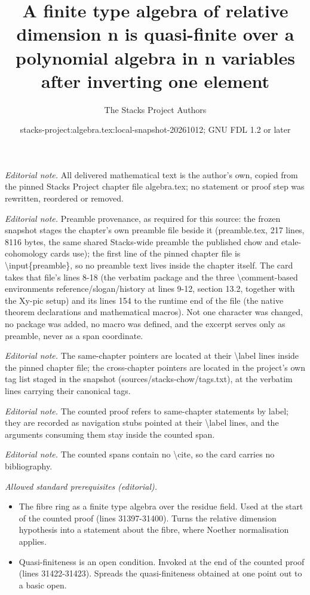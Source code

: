 \documentclass[10pt,a4paper]{amsart}
\title{A finite type algebra of relative dimension n is quasi-finite over a polynomial algebra in n variables after inverting one element}
\author{The Stacks Project Authors}
\date{stacks-project:algebra.tex:local-snapshot-20261012; GNU FDL 1.2 or later}
\theoremstyle{plain}
\theoremstyle{definition}
\theoremstyle{remark}
\numberwithin{equation}{subsection}
\begin{document}
\maketitle
\noindent\textit{Editorial note.} All delivered mathematical text is the author's own, copied from the pinned Stacks Project chapter file algebra.tex; no statement or proof step was rewritten, reordered or removed.\par\medskip
\noindent\textit{Editorial note.} Preamble provenance, as required for this source: the frozen snapshot stages the chapter's own preamble file beside it (preamble.tex, 217 lines, 8116 bytes, the same shared Stacks-wide preamble the published chow and etale-cohomology cards use); the first line of the pinned chapter file is \textbackslash{}input\{preamble\}, so no preamble text lives inside the chapter itself. The card takes that file's lines 8-18 (the verbatim package and the three \textbackslash{}comment-based environments reference/slogan/history at lines 9-12, section 13.2, together with the Xy-pic setup) and its lines 154 to the runtime end of the file (the native theorem declarations and mathematical macros). Not one character was changed, no package was added, no macro was defined, and the excerpt serves only as preamble, never as a span coordinate.\par\medskip
\noindent\textit{Editorial note.} The same-chapter pointers are located at their \textbackslash{}label lines inside the pinned chapter file; the cross-chapter pointers are located in the project's own tag list staged in the snapshot (sources/stacks-chow/tags.txt), at the verbatim lines carrying their canonical tags.\par\medskip
\noindent\textit{Editorial note.} The counted proof refers to same-chapter statements by label; they are recorded as navigation stubs pointed at their \textbackslash{}label lines, and the arguments consuming them stay inside the counted span.\par\medskip
\noindent\textit{Editorial note.} The counted spans contain no \textbackslash{}cite, so the card carries no bibliography.\par\medskip
\noindent\textit{Allowed standard prerequisites (editorial).}\begin{itemize}
\item The fibre ring as a finite type algebra over the residue field. Used at the start of the counted proof (lines 31397-31400). Turns the relative dimension hypothesis into a statement about the fibre, where Noether normalisation applies.
\item Quasi-finiteness is an open condition. Invoked at the end of the counted proof (lines 31422-31423). Spreads the quasi-finiteness obtained at one point out to a basic open.
\end{itemize}\medskip
\end{document}
